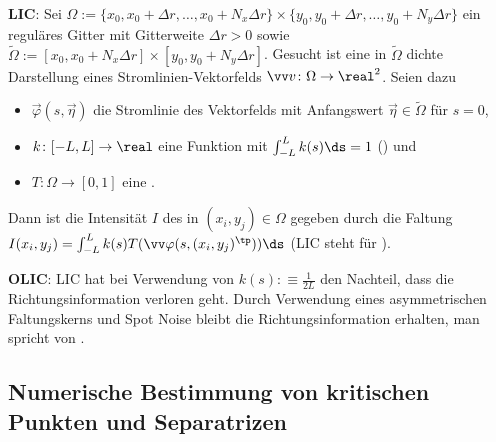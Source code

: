 \linie

\textbf{LIC}:
Sei $\Omega := \{x_0, x_0 + \Delta r, \dotsc, x_0 + N_x \Delta r\} \times
\{y_0, y_0 + \Delta r, \dotsc, y_0 + N_y \Delta r\}$
ein reguläres Gitter mit Gitterweite $\Delta r > 0$ sowie
$\widetilde{\Omega} := [x_0, x_0 + N_x \Delta r] \times [y_0, y_0 + N_y \Delta r]$.
Gesucht ist eine in $\widetilde{\Omega}$ dichte Darstellung eines Stromlinien-Vektorfelds
$\vec{v}\colon \Omega \to \real^2$.
Seien dazu
\begin{itemize}
    \item
    $\vec{\varphi}(s, \vec{\eta})$ die Stromlinie des Vektorfelds
    mit Anfangswert $\vec{\eta} \in \widetilde{\Omega}$ für $s = 0$,
    
    \item
    $k\colon [-L, L] \to \real$ eine Funktion mit $\int_{-L}^L k(s) \ds = 1$
    () und
    
    \item
    $T\colon \Omega \to [0, 1]$ eine .
\end{itemize}
Dann ist die Intensität $I$ des  in $(x_i, y_j) \in \Omega$ gegeben durch die
Faltung\\
$I(x_i, y_j) = \int_{-L}^L k(s) T(\vec{\varphi}(s, (x_i, y_j)^\tp)) \ds$
(LIC steht für ).

\textbf{OLIC}:
LIC hat bei Verwendung von $k(s) :\equiv \frac{1}{2L}$ den Nachteil, dass die Richtungsinformation
verloren geht.
Durch Verwendung eines asymmetrischen Faltungskerns und Spot Noise bleibt die Richtungsinformation
erhalten, man spricht von .

\pagebreak

\subsection{%
    Numerische Bestimmung von kritischen Punkten und Separatrizen%
}

